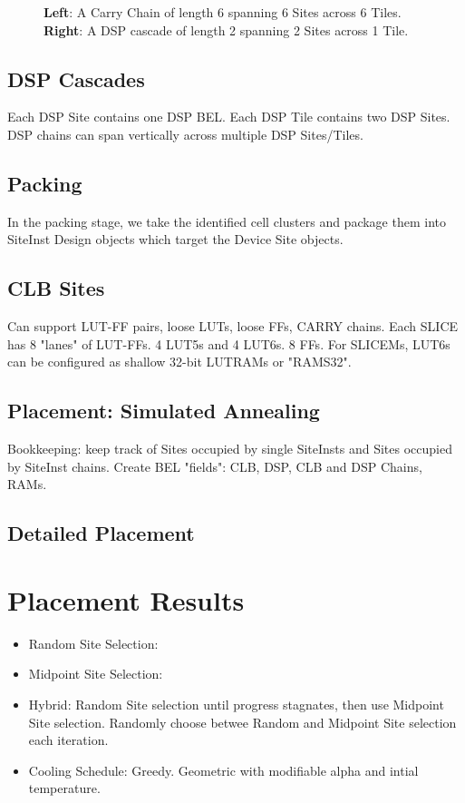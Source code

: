 \documentclass[twocolumn]{article}
\begin{document}
\begin{figure}
                \caption{\textbf{Left}: A Carry Chain of length 6 spanning 6 Sites across 6 Tiles. \textbf{Right}: A DSP cascade of length 2 spanning 2 Sites across 1 Tile.}
                \label{fig:device_carry_chain_routing}
            \end{figure}

        \subsection{DSP Cascades}
            Each DSP Site contains one DSP BEL. 
            Each DSP Tile contains two DSP Sites. 
            DSP chains can span vertically across multiple DSP Sites/Tiles. 


    \subsection{Packing}
        In the packing stage, we take the identified cell clusters and package them into SiteInst Design objects which target the Device Site objects. 
        \subsection{CLB Sites}
            Can support LUT-FF pairs, loose LUTs, loose FFs, CARRY chains. 
            Each SLICE has 8 "lanes" of LUT-FFs. 4 LUT5s and 4 LUT6s. 8 FFs. 
            For SLICEMs, LUT6s can be configured as shallow 32-bit LUTRAMs or "RAMS32". 

    \subsection{Placement: Simulated Annealing} 
        Bookkeeping: keep track of Sites occupied by single SiteInsts and Sites occupied by SiteInst chains. 
        Create BEL "fields": CLB, DSP, CLB and DSP Chains, RAMs. 

        \subsection{Detailed Placement}


\section{Placement Results}
    \begin{itemize}
    \item Random Site Selection:
    \item Midpoint Site Selection:
    \item Hybrid: 
        Random Site selection until progress stagnates, then use Midpoint Site selection. 
        Randomly choose betwee Random and Midpoint Site selection each iteration. 
    \item Cooling Schedule: 
        Greedy. 
        Geometric with modifiable alpha and intial temperature. 
    \end{itemize}
\end{document}
